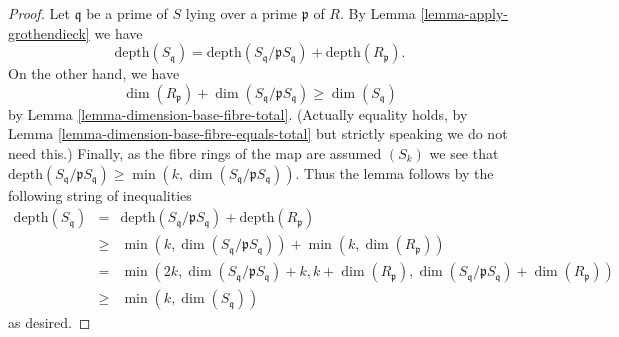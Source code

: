 \documentclass[10pt,a4paper]{amsart}
\theoremstyle{plain}
\theoremstyle{definition}
\theoremstyle{remark}
\numberwithin{equation}{subsection}
\begin{document}
\begin{proof}
Let $\mathfrak q$ be a prime of $S$
lying over a prime $\mathfrak p$ of $R$. By
Lemma \ref{lemma-apply-grothendieck} we have
$$
\text{depth}(S_{\mathfrak q}) =
\text{depth}(S_{\mathfrak q}/\mathfrak pS_{\mathfrak q}) +
\text{depth}(R_{\mathfrak p}).
$$
On the other hand, we have
$$
\dim(R_{\mathfrak p})
+
\dim(S_{\mathfrak q}/\mathfrak pS_{\mathfrak q})
\geq
\dim(S_{\mathfrak q})
$$
by Lemma \ref{lemma-dimension-base-fibre-total}.
(Actually equality holds, by
Lemma \ref{lemma-dimension-base-fibre-equals-total}
but strictly speaking we do not need this.)
Finally, as the fibre rings of the map
are assumed $(S_k)$ we see that
$\text{depth}(S_{\mathfrak q}/\mathfrak pS_{\mathfrak q})
\geq \min(k, \dim(S_{\mathfrak q}/\mathfrak pS_{\mathfrak q}))$.
Thus the lemma follows by the following string of inequalities
\begin{eqnarray*}
\text{depth}(S_{\mathfrak q}) & = &
\text{depth}(S_{\mathfrak q}/\mathfrak pS_{\mathfrak q}) +
\text{depth}(R_{\mathfrak p}) \\
& \geq &
\min(k, \dim(S_{\mathfrak q}/\mathfrak pS_{\mathfrak q})) +
\min(k, \dim(R_{\mathfrak p})) \\
& = &
\min(2k, \dim(S_{\mathfrak q}/\mathfrak pS_{\mathfrak q}) + k,
k + \dim(R_\mathfrak p),
\dim(S_{\mathfrak q}/\mathfrak pS_{\mathfrak q}) +
\dim(R_{\mathfrak p})) \\
& \geq &
\min(k, \dim(S_{\mathfrak q}))
\end{eqnarray*}
as desired.
\end{proof}
\end{document}
